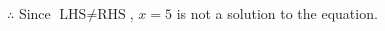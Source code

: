 \documentclass[12pt]{article}
\begin{document}
\begin{multicols}{2}
\begin{minipage}[t]{0.40\textwidth}
    \noindent \(\therefore\) Since \(\text{LHS} \neq \text{RHS}\), \(x = 5\) is not  a solution to the equation.

\end{minipage}

 \vspace*{16pt}
\newpage

\end{multicols}
\end{document}
